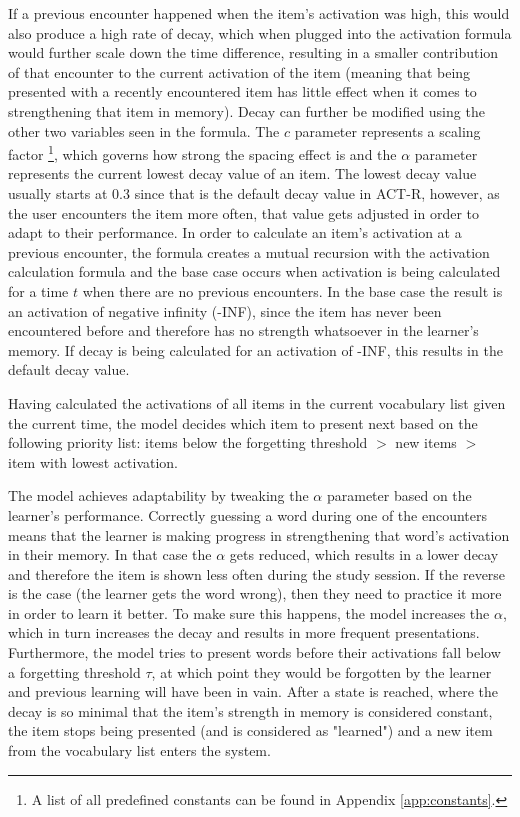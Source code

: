 \documentclass[a4paper]{report}
\begin{document}
If a previous encounter happened when the item's activation was high, this would also produce a high rate of decay, which when plugged into the activation formula would further scale down the time difference, resulting in a smaller contribution of that encounter to the current activation of the item (meaning that being presented with a recently encountered item has little effect when it comes to strengthening that item in memory). Decay can further be modified using the other two variables seen in the formula. The $c$ parameter represents a scaling factor \footnote{A list of all predefined constants can be found in Appendix \ref{app:constants}.}, which governs how strong the spacing effect is and the $\alpha$ parameter represents the current lowest decay value of an item. The lowest decay value usually starts at 0.3 since that is the default decay value in ACT-R, however, as the user encounters the item more often, that value gets adjusted in order to adapt to their performance. In order to calculate an item's activation at a previous encounter, the formula creates a mutual recursion with the activation calculation formula and the base case occurs when activation is being calculated for a time $t$ when there are no previous encounters. In the base case the result is an activation of negative infinity (-INF), since the item has never been encountered before and therefore has no strength whatsoever in the learner's memory. If decay is being calculated for an activation of -INF, this results in the default decay value.

Having calculated the activations of all items in the current vocabulary list given the current time, the model decides which item to present next based on the following priority list: items below the forgetting threshold $>$ new items $>$ item with lowest activation.

The model achieves adaptability by tweaking the $\alpha$ parameter based on the learner's performance. Correctly guessing a word during one of the encounters means that the learner is making progress in strengthening that word's activation in their memory. In that case the $\alpha$ gets reduced, which results in a lower decay and therefore the item is shown less often during the study session. If the reverse is the case (the learner gets the word wrong), then they need to practice it more in order to learn it better. To make sure this happens, the model increases the $\alpha$, which in turn increases the decay and results in more frequent presentations. Furthermore, the model tries to present words before their activations fall below a forgetting threshold $\tau$, at which point they would be forgotten by the learner and previous learning will have been in vain. After a state is reached, where the decay is so minimal that the item's strength in memory is considered constant, the item stops being presented (and is considered as "learned") and a new item from the vocabulary list enters the system.
\end{document}
